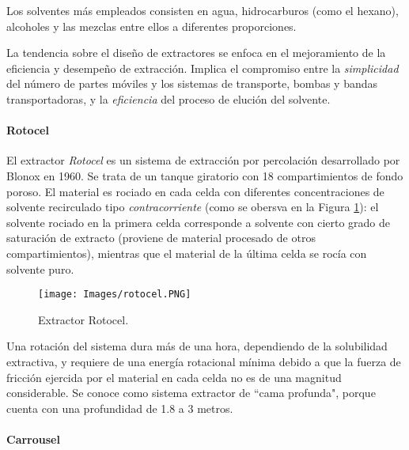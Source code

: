 \noindent
\justify

Los solventes m\'as empleados consisten en agua, hidrocarburos (como el hexano), alcoholes y las mezclas entre ellos a diferentes proporciones.

\newpage

\noindent
\justify

La tendencia sobre el dise\~no de extractores se enfoca en el mejoramiento de la eficiencia y desempe\~no de extracci\'on. Implica el compromiso entre la \textit{simplicidad} del n\'umero de partes m\'oviles y los sistemas de transporte, bombas y bandas transportadoras, y la \textit{eficiencia} del proceso de eluci\'on del solvente. 

\paragraph{Rotocel}

\noindent
\justify

El extractor \textit{Rotocel} es un sistema de extracci\'on por percolaci\'on desarrollado por Blonox en 1960. Se trata de un tanque giratorio con 18 compartimientos de fondo poroso. El material es rociado en cada celda con diferentes concentraciones de solvente recirculado tipo \textit{contracorriente} (como se obersva en la Figura \ref{rotocel}): el solvente rociado en la primera celda corresponde a solvente con cierto grado de saturaci\'on de extracto (proviene de material procesado de otros compartimientos), mientras que el material de la \'ultima celda se roc\'ia con solvente puro.

\begin{figure}[h!]
	\centering
	\texttt{[image: Images/rotocel.PNG]}
	\caption{Extractor Rotocel.}
	\label{rotocel}
\end{figure}

\noindent
\justify

Una rotaci\'on del sistema dura m\'as de una hora, dependiendo de la solubilidad extractiva, y requiere de una energ\'ia rotacional m\'inima debido a que la fuerza de fricci\'on ejercida por el material en cada celda no es de una magnitud considerable. Se conoce como sistema extractor de ``cama profunda", porque cuenta con una profundidad de 1.8 a 3 metros. 

\newpage

\paragraph{Carrousel}

